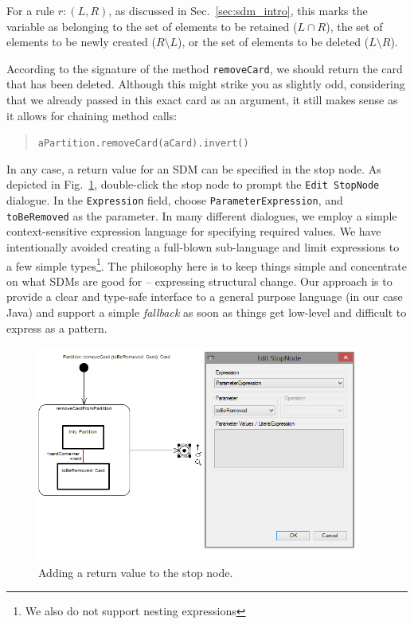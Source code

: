 For a rule $r: (L, R)$, as discussed in Sec.~\ref{sec:sdm_intro}, this marks the variable as belonging to the set of elements to be retained ($L\cap R$), the set of elements to be newly created ($R\setminus L$), or the set of elements to be deleted ($L\setminus R$).
 
According to the signature of the method \texttt{removeCard}, we should return the card that has been deleted.  
Although this might strike you as slightly odd, considering that we already passed in this exact card as an argument, it still makes sense as it allows for chaining method calls: \begin{quote}\texttt{aPartition.removeCard(aCard).invert()}\end{quote}
In any case, a return value for an SDM can be specified in the stop node.
As depicted in Fig.~\ref{fig:stop_node_return_value}, double-click the stop node to prompt the \texttt{Edit StopNode} dialogue.
In the \texttt{Expression} field, choose \texttt{ParameterExpression}, and \texttt{toBeRemoved} as the parameter.  
In many different dialogues, we employ a simple context-sensitive expression language for specifying required values.  
We have intentionally avoided creating a full-blown sub-language and limit expressions to a few simple types\footnote{We also do not support nesting expressions}.  
The philosophy here is to keep things simple and concentrate on what SDMs are good for -- expressing structural change.  
Our approach is to provide a clear and type-safe interface to a general purpose language (in our case Java) and support a simple \emph{fallback} as soon as things get low-level and difficult to express as a pattern.  

\begin{figure}[htp]
\begin{center}
  \includegraphics[width=0.95\textwidth]{pics/sdmBilder/removeCard/sdm14RAW.png}
  \caption{Adding a return value to the stop node.}  
  \label{fig:stop_node_return_value}
\end{center}
\end{figure}

